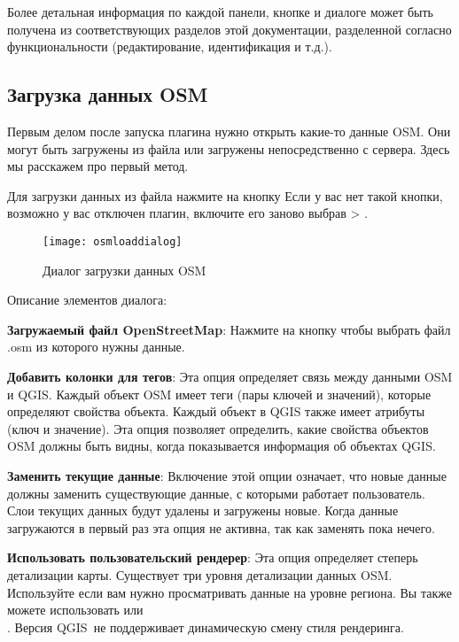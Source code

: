 Более детальная информация по каждой панели, кнопке и диалоге может быть
получена из соответствующих разделов этой документации, разделенной
согласно функциональности (редактирование, идентификация и т.д.).

\subsection{Загрузка данных OSM}

Первым делом после запуска плагина нужно открыть какие-то данные OSM.
Они могут быть загружены из файла или загружены непосредственно с
сервера. Здесь мы расскажем про первый метод.

Для загрузки данных из файла нажмите на кнопку
 Если у вас нет такой
кнопки, возможно у вас отключен плагин, включите его заново выбрав
 \arrow {} >
.

\begin{figure}[ht]
   \centering
   \texttt{[image: osmloaddialog]}
   \caption{Диалог загрузки данных OSM \wincaption}\label{fig:osmload}
\end{figure}

Описание элементов диалога:

\begin{description}
\item \textbf{Загружаемый файл OpenStreetMap}: Нажмите на кнопку чтобы
выбрать файл .osm из которого нужны данные.
\item \textbf{Добавить колонки для тегов}: Эта опция определяет связь
между данными OSM и QGIS. Каждый объект OSM имеет теги (пары ключей и
значений), которые определяют свойства объекта. Каждый объект в QGIS
также имеет атрибуты (ключ и значение). Эта опция позволяет определить,
какие свойства объектов OSM должны быть видны, когда показывается
информация об объектах QGIS.
\item \textbf{Заменить текущие данные}: Включение этой опции означает,
что новые данные должны заменить существующие данные, с которыми
работает пользователь. Слои текущих данных будут удалены и загружены
новые. Когда данные загружаются в первый раз эта опция не активна, так
как заменять пока нечего.
\item \textbf{Использовать пользовательский рендерер}: Эта опция
определяет степерь детализации карты. Существует три уровня детализации
данных OSM. Используйте  если вам нужно
просматривать данные на уровне региона. Вы также можете использовать
 или \\
. Версия QGIS~\CURRENT не поддерживает
динамическую смену стиля рендеринга.
\end{description}

